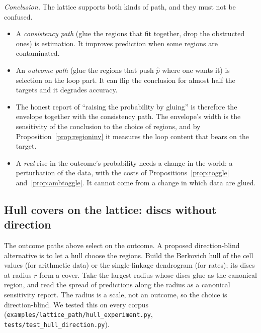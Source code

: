 \documentclass[11pt]{article}
\theoremstyle{definition}
\theoremstyle{remark}
\begin{document}
\noindent\emph{Conclusion.} The lattice supports both kinds of path, and they must not be confused.
\begin{itemize}
  \item A \emph{consistency path} (glue the regions that fit together, drop the obstructed ones) is estimation. It improves prediction when some regions are contaminated.
  \item An \emph{outcome path} (glue the regions that push $\hat p$ where one wants it) is selection on the loop part. It can flip the conclusion for almost half the targets and it degrades accuracy.
  \item The honest report of ``raising the probability by gluing'' is therefore the envelope together with the consistency path. The envelope's width is the sensitivity of the conclusion to the choice of regions, and by Proposition~\ref{prop:regioninv} it measures the loop content that bears on the target.
  \item A \emph{real} rise in the outcome's probability needs a change in the world: a perturbation of the data, with the costs of Propositions~\ref{prop:toggle} and~\ref{prop:ambtoggle}. It cannot come from a change in which data are glued.
\end{itemize}

\subsection{Hull covers on the lattice: discs without direction}\label{sec:hullcover}
The outcome paths above select on the outcome. A proposed direction-blind alternative is to let a hull choose the regions. Build the Berkovich hull of the cell values (for arithmetic data) or the single-linkage dendrogram (for rates); its discs at radius $r$ form a cover. Take the largest radius whose discs glue as the canonical region, and read the spread of predictions along the radius as a canonical sensitivity report. The radius is a scale, not an outcome, so the choice is direction-blind. We tested this on every corpus (\texttt{examples/lattice\_path/hull\_experiment.py}, \texttt{tests/test\_hull\_direction.py}).
\end{document}
